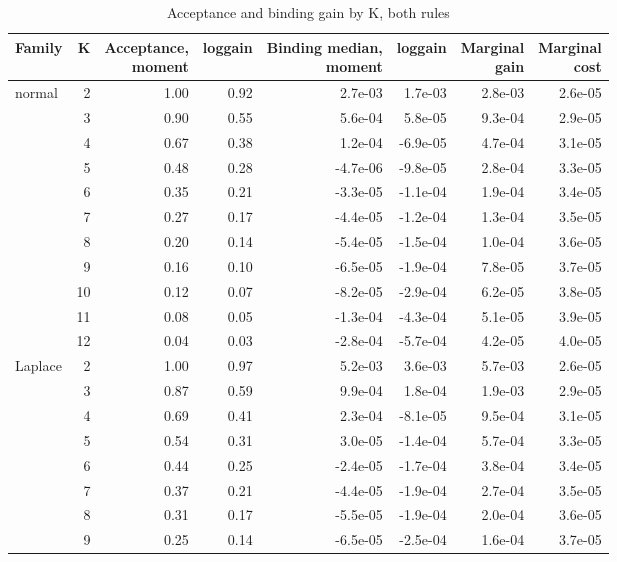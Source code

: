 \begin{table}
\centering
\caption{Acceptance and binding gain by K, both rules}
\label{tab:a5_acceptance_by_K}
\small
\begin{tabular}{lrrrrrrr}
\toprule
Family & K & \makecell[b]{Acceptance,\\{}moment} & loggain & \makecell[b]{Binding median,\\{}moment} & loggain & \makecell[b]{Marginal\\{}gain} & \makecell[b]{Marginal\\{}cost} \\
\midrule
normal & 2 & 1.00 & 0.92 & 2.7e-03 & 1.7e-03 & 2.8e-03 & 2.6e-05 \\
 & 3 & 0.90 & 0.55 & 5.6e-04 & 5.8e-05 & 9.3e-04 & 2.9e-05 \\
 & 4 & 0.67 & 0.38 & 1.2e-04 & -6.9e-05 & 4.7e-04 & 3.1e-05 \\
 & 5 & 0.48 & 0.28 & -4.7e-06 & -9.8e-05 & 2.8e-04 & 3.3e-05 \\
 & 6 & 0.35 & 0.21 & -3.3e-05 & -1.1e-04 & 1.9e-04 & 3.4e-05 \\
 & 7 & 0.27 & 0.17 & -4.4e-05 & -1.2e-04 & 1.3e-04 & 3.5e-05 \\
 & 8 & 0.20 & 0.14 & -5.4e-05 & -1.5e-04 & 1.0e-04 & 3.6e-05 \\
 & 9 & 0.16 & 0.10 & -6.5e-05 & -1.9e-04 & 7.8e-05 & 3.7e-05 \\
 & 10 & 0.12 & 0.07 & -8.2e-05 & -2.9e-04 & 6.2e-05 & 3.8e-05 \\
 & 11 & 0.08 & 0.05 & -1.3e-04 & -4.3e-04 & 5.1e-05 & 3.9e-05 \\
 & 12 & 0.04 & 0.03 & -2.8e-04 & -5.7e-04 & 4.2e-05 & 4.0e-05 \\
Laplace & 2 & 1.00 & 0.97 & 5.2e-03 & 3.6e-03 & 5.7e-03 & 2.6e-05 \\
 & 3 & 0.87 & 0.59 & 9.9e-04 & 1.8e-04 & 1.9e-03 & 2.9e-05 \\
 & 4 & 0.69 & 0.41 & 2.3e-04 & -8.1e-05 & 9.5e-04 & 3.1e-05 \\
 & 5 & 0.54 & 0.31 & 3.0e-05 & -1.4e-04 & 5.7e-04 & 3.3e-05 \\
 & 6 & 0.44 & 0.25 & -2.4e-05 & -1.7e-04 & 3.8e-04 & 3.4e-05 \\
 & 7 & 0.37 & 0.21 & -4.4e-05 & -1.9e-04 & 2.7e-04 & 3.5e-05 \\
 & 8 & 0.31 & 0.17 & -5.5e-05 & -1.9e-04 & 2.0e-04 & 3.6e-05 \\
 & 9 & 0.25 & 0.14 & -6.5e-05 & -2.5e-04 & 1.6e-04 & 3.7e-05 \\

\end{tabular}
\end{table}
